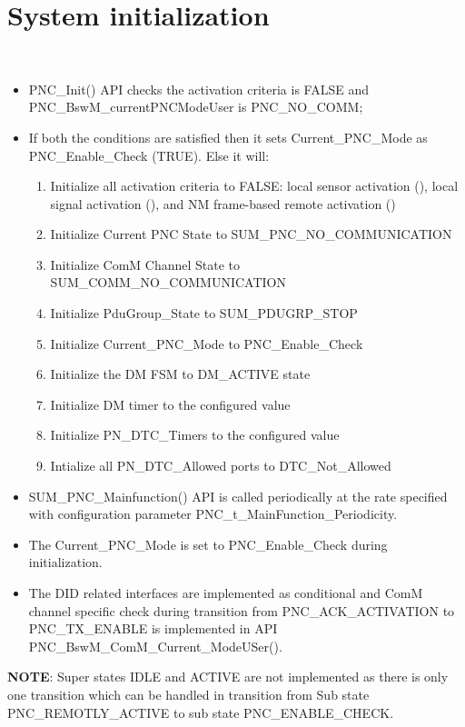 \section{System initialization}
\\
\begin{itemize}
	\item PNC_Init() API checks the activation criteria is FALSE and PNC_BswM_currentPNCModeUser is PNC_NO_COMM;
	\item If both the conditions are satisfied then it sets Current_PNC_Mode as PNC_Enable_Check (TRUE). Else it will:
	\begin{enumerate}[label=\roman*]
		\item Initialize all activation criteria to FALSE: local sensor activation (), local signal activation (), and NM frame-based remote activation ()
		\item Initialize Current PNC State to SUM_PNC_NO_COMMUNICATION
		\item Initialize ComM Channel State to SUM_COMM_NO_COMMUNICATION
		\item Initialize PduGroup_State to SUM_PDUGRP_STOP
		\item Initialize Current_PNC_Mode to PNC_Enable_Check 
		\item Initialize the DM FSM to DM_ACTIVE state
		\item Initialize DM timer to the configured value
		\item Initialize PN_DTC_Timers to the configured value
		\item Intialize all PN_DTC_Allowed ports to DTC_Not_Allowed	
	\end{enumerate}
	\item SUM_PNC_Mainfunction() API is called periodically at the rate specified with configuration parameter PNC_t_MainFunction_Periodicity.
	\item The Current_PNC_Mode is set to PNC_Enable_Check during initialization.
	\item The DID related interfaces are implemented as conditional and ComM channel specific check during transition from PNC_ACK_ACTIVATION to PNC_TX_ENABLE is implemented in API PNC_BswM_ComM_Current_ModeUSer().	
\end{itemize}
\noindent
\textbf{NOTE}: Super states IDLE and ACTIVE are not implemented as there is only one transition which can be handled in transition from Sub state PNC_REMOTLY_ACTIVE to sub state PNC_ENABLE_CHECK.
\\
   

